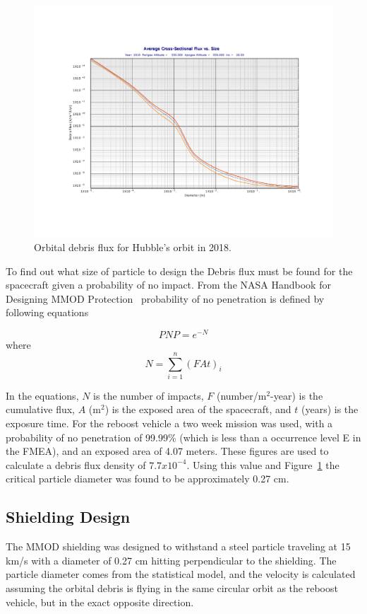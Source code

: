 \documentclass[paper=letter, fontsize=11pt]{scrartcl} %
\numberwithin{equation}{section} %
\numberwithin{figure}{section} %
\numberwithin{table}{section} %
\begin{document}
\begin{figure}[H]
	\begin{center}
	\includegraphics[width=5.5in]{hstOrbit.pdf}
	\caption{Orbital debris flux for Hubble's orbit in 2018.}
	\label{fig:hubbleOrbit}
	\end{center}
\end{figure}

To find out what size of particle to design the Debris flux must be found for the spacecraft given a probability of no impact. From the NASA Handbook for Designing MMOD Protection~\cite{handbook_mmod} probability of no penetration is defined by following equations

\begin{equation*}
PNP = e^{-N}
\end{equation*}
where
\begin{equation*}
N = \sum\limits_{i=1}^n (FAt)_i
\end{equation*}

In the equations, $N$ is the number of impacts, $F$ (number/m$^2$-year) is the cumulative flux, $A$ (m$^2$) is the exposed area of the spacecraft, and $t$ (years) is the exposure time. For the reboost vehicle a two week mission was used, with a probability of no penetration of 99.99\% (which is less than a occurrence level E in the FMEA), and an exposed area of 4.07 meters. These figures are used to calculate a debris flux density of $7.7 x 10^{-4}$. Using this value and Figure~\ref{fig:hubbleOrbit} the critical particle diameter was found to be approximately 0.27 cm.

\subsection{Shielding Design}
The MMOD shielding was designed to withstand a steel particle traveling at 15 km/s with a diameter of 0.27 cm hitting perpendicular to the shielding. The particle diameter comes from the statistical model, and the velocity is calculated assuming the orbital debris is flying in the same circular orbit as the reboost vehicle, but in the exact opposite direction.
\end{document}
